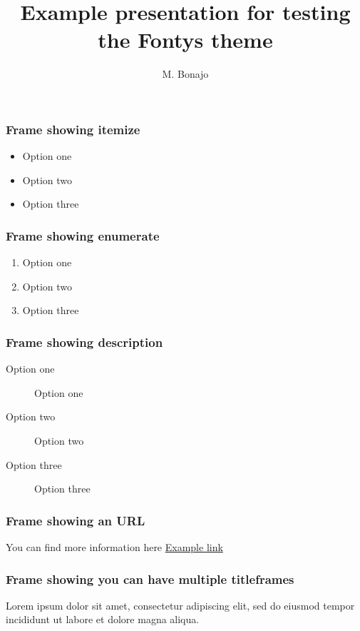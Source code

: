 \documentclass[aspectratio=169]{beamer}
\title{Example presentation for testing the Fontys theme}
\institute{FHTenL}
\author{M. Bonajo}
\begin{document}
\begin{titleframe}
    \titlepage
\end{titleframe}

\begin{frame}
    \frametitle{Frame showing itemize}

    \begin{itemize}
        \item Option one
        \item Option two
        \item Option three
    \end{itemize}

\end{frame}

\begin{frame}
    \frametitle{Frame showing enumerate}

    \begin{enumerate}
        \item Option one
        \item Option two
        \item Option three
    \end{enumerate}

\end{frame}

\begin{frame}
    \frametitle{Frame showing description}

    \begin{description}
        \item[Option one] Option one
        \item[Option two] Option two
        \item[Option three] Option three
    \end{description}

\end{frame}

\begin{frame}
    \frametitle{Frame showing an URL}
    
    You can find more information here \href{http://www.example.com}{Example link}

\end{frame}

\begin{titleframe}
    \frametitle{Frame showing you can have multiple titleframes}
    Lorem ipsum dolor sit amet, consectetur adipiscing elit, sed do eiusmod tempor incididunt ut labore et dolore magna aliqua. 
\end{titleframe}
\end{document}
